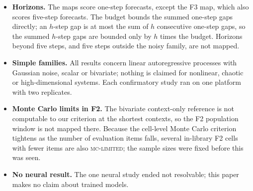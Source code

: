 \begin{itemize}
parts depends on the intermediate references and on their order; in F2 the two orders disagree on which part is larger in
most cells (every $r$ at $n=10$, and $r=4$ at the next grid point), so we report both and draw no general conclusion about
which dominates.
\item \textbf{Horizons.} The maps score one-step forecasts, except the F3 map, which also scores five-step forecasts. The
budget bounds the summed one-step gaps directly; an $h$-step gap is at most the sum of $h$ consecutive one-step gaps, so the
summed $h$-step gaps are bounded only by $h$ times the budget. Horizons beyond five steps, and five steps outside the noisy
family, are not mapped.
\item \textbf{Simple families.} All results concern linear autoregressive processes with Gaussian noise, scalar or
bivariate; nothing is claimed for nonlinear, chaotic or high-dimensional systems. Each confirmatory study ran on one platform
with two replicates.
\item \textbf{Monte Carlo limits in F2.} The bivariate context-only reference is not computable to our criterion at the
shortest contexts, so the F2 population window is not mapped there. Because the cell-level Monte Carlo criterion tightens as
the number of evaluation items falls, several in-library F2 cells with fewer items are also \textsc{mc-limited}; the sample
sizes were fixed before this was seen.
\item \textbf{No neural result.} The one neural study ended not resolvable; this paper makes no claim about trained models.
\end{itemize}
